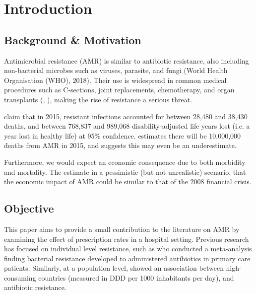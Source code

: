 \documentclass[11pt,twoside]{article}
\numberwithin{Theorem}{section}
\numberwithin{Definition}{section}
\numberwithin{Lemma}{section}
\numberwithin{Algorithm}{section}
\numberwithin{equation}{section}
\begin{document}
\clearpage

\section{Introduction}
\label{sec.intro}

\subsection{Background \& Motivation}

Antimicrobial resistance (AMR) is similar to antibiotic resistance, also including non-bacterial microbes such as viruses, parasite, and fungi (World Health Organisation (WHO), 2018). Their use is widespread in common medical procedures such as C-sections, joint replacements, chemotherapy, and organ transplants (\cite{Roope2019}, \cite{WHO2018}), making the rise of resistance a serious threat.  

\cite{Cassini2018} claim that in 2015, resistant infections accounted for between 28,480 and 38,430 deaths, and between 768,837 and 989,068 disability-adjusted life years lost (i.e. a year lost in healthy life) at 95\% confidence. \cite{ONeill2014, ONeill2016} estimates there will be 10,000,000 deaths from AMR in 2015, and suggests this may even be an underestimate. 

Furthermore, we would expect an economic consequence due to both morbidity and mortality. The \cite{WorldBank2017} estimate in a pessimistic (but not unrealistic) scenario, that the economic impact of AMR could be similar to that of the 2008 financial crisis. 


\subsection{Objective}

This paper aims to provide a small contribution to the literature on AMR by examining the effect of prescription rates in a hospital setting. Previous research has focused on individual level resistance, such as \cite{Costelloe2010} who conducted a meta-analysis finding bacterial resistance developed to administered antibiotics in primary care patients. Similarly, at a population level, \cite{Goossens2005} showed an association between high-consuming countries (measured in DDD per 1000 inhabitants per day), and antibiotic resistance. 
\end{document}
